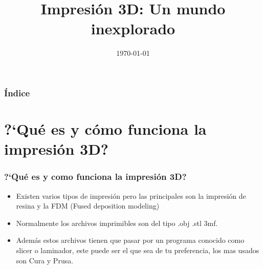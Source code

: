 \documentclass{beamer}
\title[SIAM]{Impresi\'on 3D: Un mundo inexplorado} %
\institute[UTFSM] %
{


\vspace{2cm}
\medskip

Mat\'ias Mart\'inez\\%

}
\date{\today} %
\newcounter{cont}
\begin{document}
\begin{frame}
\titlepage %
\end{frame}
\begin{frame}
  \frametitle{\'Indice}
 \tableofcontents
\end{frame}




\section{?`Qu\'e es y c\'omo funciona la impresi\'on 3D?} 
\begin{frame}[allowframebreaks]
\frametitle{?`Qu\'e es y como funciona la impresi\'on 3D?}
\begin{itemize}
    \item 
Existen varios tipos de impresi\'on pero las principales son la impresi\'on de resina y la FDM (Fused deposition modeling)\\
\item Normalmente los archivos imprimibles son del tipo .obj .stl 3mf.\\
\item Adem\'as estos archivos tienen que pasar por un programa conocido como slicer o laminador, este puede ser el que sea de tu preferencia, los mas usados son Cura y Prusa.
\end{itemize}
\end{frame}
\end{document}

